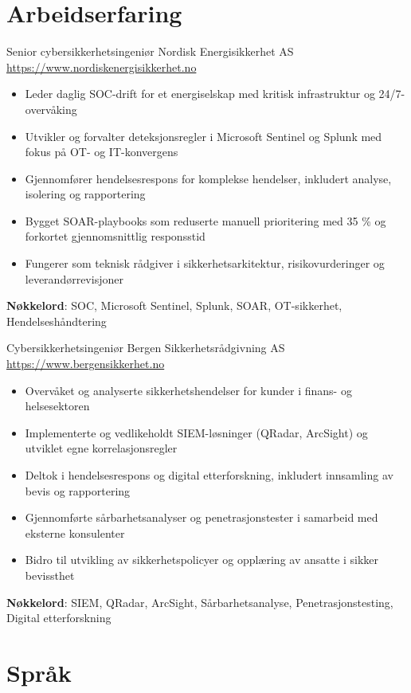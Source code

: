 \documentclass[a4paper, serif, 10pt]{moderncv}
\begin{document}
\section{Arbeidserfaring}

        {Senior cybersikkerhetsingeniør}
        {Nordisk Energisikkerhet AS}
        {\url{https://www.nordiskenergisikkerhet.no}}
        {}
        {\begin{itemize}
\item Leder daglig SOC-drift for et energiselskap med kritisk infrastruktur og 24/7-overvåking
\item Utvikler og forvalter deteksjonsregler i Microsoft Sentinel og Splunk med fokus på OT- og IT-konvergens
\item Gjennomfører hendelsesrespons for komplekse hendelser, inkludert analyse, isolering og rapportering
\item Bygget SOAR-playbooks som reduserte manuell prioritering med 35 \% og forkortet gjennomsnittlig responsstid
\item Fungerer som teknisk rådgiver i sikkerhetsarkitektur, risikovurderinger og leverandørrevisjoner
\end{itemize}
\textbf{Nøkkelord}: SOC, Microsoft Sentinel, Splunk, SOAR, OT-sikkerhet, Hendelseshåndtering}

        {Cybersikkerhetsingeniør}
        {Bergen Sikkerhetsrådgivning AS}
        {\url{https://www.bergensikkerhet.no}}
        {}
        {\begin{itemize}
\item Overvåket og analyserte sikkerhetshendelser for kunder i finans- og helsesektoren
\item Implementerte og vedlikeholdt SIEM-løsninger (QRadar, ArcSight) og utviklet egne korrelasjonsregler
\item Deltok i hendelsesrespons og digital etterforskning, inkludert innsamling av bevis og rapportering
\item Gjennomførte sårbarhetsanalyser og penetrasjonstester i samarbeid med eksterne konsulenter
\item Bidro til utvikling av sikkerhetspolicyer og opplæring av ansatte i sikker bevissthet
\end{itemize}
\textbf{Nøkkelord}: SIEM, QRadar, ArcSight, Sårbarhetsanalyse, Penetrasjonstesting, Digital etterforskning}
\section{Språk}
\end{document}
